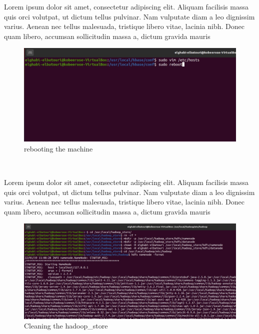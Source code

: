 \begin{spacing}{1.2}
\par Lorem ipsum dolor sit amet, consectetur adipiscing elit. Aliquam facilisis massa quis orci volutpat, ut dictum tellus pulvinar. Nam vulputate diam a leo dignissim varius. Aenean nec tellus malesuada, tristique libero vitae, lacinia nibh. Donec quam libero, accumsan sollicitudin massa a, dictum gravida mauris
\\
\begin{figure}[!htb] 
\begin{center} 
\includegraphics[width=1\linewidth]{Pictures/HBase/Configuring Hbase in Standalone & Pseudo-distributed mode/Installing and Configuring Apache Hbase/rebooting the machine} 
\end{center} 
\caption{rebooting the machine} 
\end{figure}  \FloatBarrier
\\

\par Lorem ipsum dolor sit amet, consectetur adipiscing elit. Aliquam facilisis massa quis orci volutpat, ut dictum tellus pulvinar. Nam vulputate diam a leo dignissim varius. Aenean nec tellus malesuada, tristique libero vitae, lacinia nibh. Donec quam libero, accumsan sollicitudin massa a, dictum gravida mauris
\\
\begin{figure}[!htb] 
\begin{center} 
\includegraphics[width=1\linewidth]{Pictures/HBase/Configuring Hbase in Standalone & Pseudo-distributed mode/Installing and Configuring Apache Hbase/Cleaning the hadoop_store} 
\end{center} 
\caption{Cleaning the hadoop_store} 
\end{figure}  \FloatBarrier
\\


\end{spacing}
